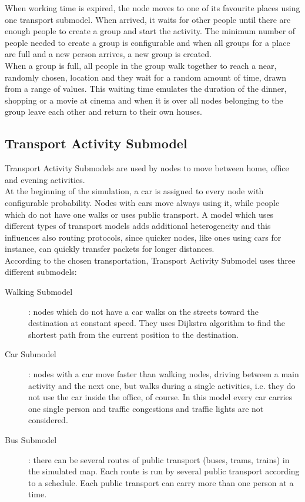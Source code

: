 When working time is expired, the node moves to one of its favourite places using one transport submodel. When arrived, it waits for other people until there are enough people to create a group and start the activity. The minimum number of people needed to create a group is configurable and when all groups for a place are full and a new person arrives, a new group is created.
\\

When a group is full, all people in the group walk together to reach a near, randomly chosen, location and they wait for a random amount of time, drawn from a range of values. This waiting time emulates the duration of the dinner, shopping or a movie at cinema and when it is over all nodes belonging to the group leave each other and return to their own houses.

\subsection{Transport Activity Submodel}
Transport Activity Submodels are used by nodes to move between home, office and evening activities.
\\

At the beginning of the simulation, a car is assigned to every node with configurable probability. Nodes with cars move always using it, while people which do not have one walks or uses public transport. A model which uses different types of transport models adds additional heterogeneity and this influences also routing protocols, since quicker nodes, like ones using cars for instance, can quickly transfer packets for longer distances.
\\

According to the chosen transportation, Transport Activity Submodel uses three different submodels:
\\

\begin{description}
\item [Walking Submodel]: nodes which do not have a car walks on the streets toward the destination at constant speed. They uses Dijkstra algorithm to find the shortest path from the current position to the destination.

\item [Car Submodel]: nodes with a car move faster than walking nodes, driving between a main activity and the next one, but walks during a single activities, i.e. they do not use the car inside the office, of course. In this model every car carries one single person and traffic congestions and traffic lights are not considered.

\item [Bus Submodel]: there can be several routes of public transport (buses, trams, trains) in the simulated map. Each route is run by several public transport according to a schedule. Each public transport can carry more than one person at a time.
\end{description}

